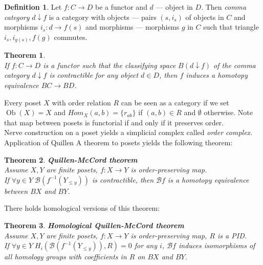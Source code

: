 \documentclass[a4paper, 12pt]{article}
\newtheorem{theorem}{Theorem}
\theoremstyle{definition}
\newtheorem{definition}{Definition}
\theoremstyle{remark}
\newcommand{\define}[1]{{\textit{#1}}}
\begin{document}
\begin{definition}
  Let $f: C \to D$ be a functor and $d$ --- object in $D$. Then \define{comma category} $d \downarrow f$ is a category with objects --- pairs $(s,i_s)$ of objects in $C$ and morphisms $i_s : d \to f(s)$ and morphisms --- morphisms $g$ in $C$ such that triangle $i_s, i_{g(s)}, f(g)$ commutes.
\end{definition}

\begin{theorem} {\cite[Theorem A]{Quillen72}}\\
  If $f: C \to D$ is a functor such that the classifying space $B(d \downarrow f)$ of the comma category $d \downarrow f$ is contractible for any object $d \in D$, then $f$ induces a homotopy equivalence $BC \to BD$.
\end{theorem}

Every poset $X$ with order relation $R$ can be seen as a category if we set $\operatorname{Ob}(X) = X$ and $Hom_X(a,b) = \{r_{ab}\}$ if $(a,b) \in R$ and $\emptyset$ otherwise. Note that map between posets is functorial if and only if it preserves order.\\
Nerve construction on a poset yields a simplicial complex called \define{order complex}. Application of Quillen A theorem to posets yields the following theorem:

\begin{theorem} \textbf{Quillen-McCord theorem}\\
  Assume $X, Y$ are finite posets, $f : X \to Y$ is order-preserving map.\\
  If $\forall y \in Y\;\mathcal{B}(f^{-1}(Y_{\leqslant y}))$ is contractible, then $\mathcal{B}f$ is a homotopy equivalence between $BX$ and $BY$.\\
\end{theorem}

There holds homological {\cite[Corollary 5.5]{Bar11}} versions of this theorem:

\begin{theorem} \textbf{Homological Quillen-McCord theorem}\\
  Assume $X, Y$ are finite posets, $f : X \to Y$ is order-preserving map, $R$ is a PID.\\
  If $\forall y \in Y\;H_i(\mathcal{B}(f^{-1}(Y_{\leqslant y})),R) = 0$ for any $i$, $\mathcal{B}f$ induces isomorphisms of all homology groups with coefficients in $R$ on $BX$ and $BY$.\\
\end{theorem}
\end{document}
